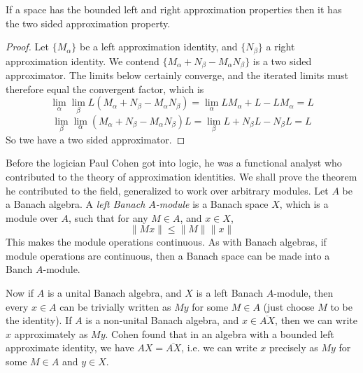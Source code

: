 \begin{lemma}
    If a space has the bounded left and right approximation properties then it has the two sided approximation property.
\end{lemma}
\begin{proof}
    Let $\{ M_\alpha \}$ be a left approximation identity, and $\{ N_\beta \}$ a right approximation identity. We contend $\{ M_\alpha + N_\beta - M_\alpha N_\beta \}$ is a two sided approximator. The limits below certainly converge, and the iterated limits must therefore equal the convergent factor, which is
    \[ \lim_\alpha \lim_\beta L(M_\alpha + N_\beta - M_\alpha N_\beta) = \lim_\alpha LM_\alpha + L - LM_\alpha = L \]
    \[ \lim_\beta \lim_\alpha (M_\alpha + N_\beta - M_\alpha N_\beta)L = \lim_\beta L + N_\beta L - N_\beta L = L \]
    So twe have a two sided approximator.
\end{proof}

Before the logician Paul Cohen got into logic, he was a functional analyst who contributed to the theory of approximation identities. We shall prove the theorem he contributed to the field, generalized to work over arbitrary modules. Let $A$ be a Banach algebra. A \emph{left Banach $A$-module} is a Banach space $X$, which is a module over $A$, such that for any $M \in A$, and $x \in X$,
%
\[ \| Mx \| \leq \| M \| \| x \| \]
%
This makes the module operations continuous. As with Banach algebras, if module operations are continuous, then a Banach space can be made into a Banch $A$-module.

Now if $A$ is a unital Banach algebra, and $X$ is a left Banach $A$-module, then every $x \in A$ can be trivially written as $My$ for some $M \in A$ (just choose $M$ to be the identity). If $A$ is a non-unital Banach algebra, and $x \in \overline{A X}$, then we can write $x$ approximately as $My$. Cohen found that in an algebra with a bounded left approximate identity, we have $AX = \overline{AX}$, i.e. we can write $x$ precisely as $My$ for some $M \in A$ and $y \in X$.

